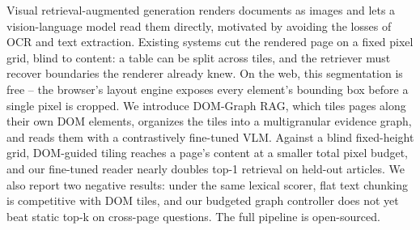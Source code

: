 Visual retrieval-augmented generation renders documents as images and lets a vision-language model read them directly, motivated by avoiding the losses of OCR and text extraction. Existing systems cut the rendered page on a fixed pixel grid, blind to content: a table can be split across tiles, and the retriever must recover boundaries the renderer already knew. On the web, this segmentation is free -- the browser's layout engine exposes every element's bounding box before a single pixel is cropped. We introduce DOM-Graph RAG, which tiles pages along their own DOM elements, organizes the tiles into a multigranular evidence graph, and reads them with a contrastively fine-tuned VLM. Against a blind fixed-height grid, DOM-guided tiling reaches a page's content at a smaller total pixel budget, and our fine-tuned reader nearly doubles top-1 retrieval on held-out articles. We also report two negative results: under the same lexical scorer, flat text chunking is competitive with DOM tiles, and our budgeted graph controller does not yet beat static top-k on cross-page questions. The full pipeline is open-sourced.